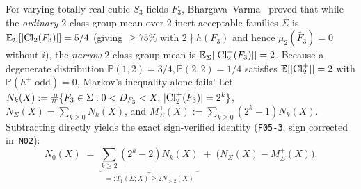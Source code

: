 For varying totally real cubic $S_3$ fields $F_3$, Bhargava--Varma~\cite{BV2015} proved that while the \emph{ordinary} $2$-class group mean over $2$-inert acceptable families $\Sigma$ is $\mathbb{E}_\Sigma[|\mathrm{Cl}_2(F_3)|] = 5/4$ (giving $\ge 75\%$ with $2 \nmid h(F_3)$ and hence $\mu_2(\widetilde{F_3}) = 0$ without $i$), the \emph{narrow} $2$-class group mean is $\mathbb{E}_\Sigma[|\mathrm{Cl}_2^+(F_3)|] = 2$. Because a degenerate distribution $\mathbb{P}(1,2) = 3/4, \mathbb{P}(2,2) = 1/4$ satisfies $\mathbb{E}[|\mathrm{Cl}_2^+|] = 2$ with $\mathbb{P}(h^+ \text{ odd}) = 0$, Markov's inequality alone fails! Let $N_k(X) := \#\{F_3 \in \Sigma : 0 < D_{F_3} < X,\, |\mathrm{Cl}_2^+(F_3)| = 2^k\}$, $N_{\Sigma}(X) = \sum_{k \ge 0} N_k(X)$, and $M_\Sigma^+(X) := \sum_{k \ge 0} (2^k - 1) N_k(X)$. Subtracting directly yields the exact sign-verified identity (\texttt{F05-3}, sign corrected in~\texttt{N02}):
\begin{equation}\label{eq:4:N0id}
  N_0(X) \;=\; \underbrace{\sum_{k \ge 2} (2^k - 2) N_k(X)}_{=: T_1(\Sigma; X) \ge 2 N_{\ge 2}(X)} \;+\; \bigl(N_\Sigma(X) - M_\Sigma^+(X)\bigr).
\end{equation}

